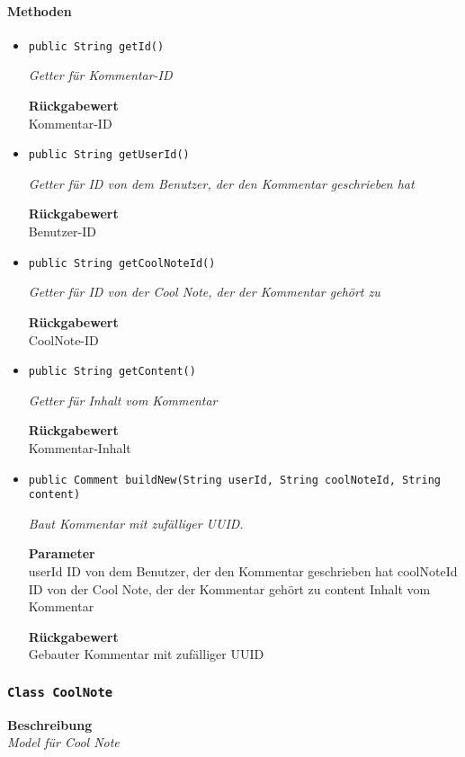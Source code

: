     \paragraph*{Methoden}
    \begin{itemize}
    	\item{\texttt{public String getId()}}
    	
    	\textit{Getter für Kommentar-ID}
    	
    	
    	
    	\textbf{Rückgabewert} \\
    	Kommentar-ID        \item{\texttt{public String getUserId()}}
    	
    	\textit{Getter für ID von dem Benutzer, der den Kommentar geschrieben hat}
    	
    	
    	
    	\textbf{Rückgabewert} \\
    	Benutzer-ID        \item{\texttt{public String getCoolNoteId()}}
    	
    	\textit{Getter für ID von der Cool Note, der der Kommentar gehört zu}
    	
    	
    	
    	\textbf{Rückgabewert} \\
    	CoolNote-ID        \item{\texttt{public String getContent()}}
    	
    	\textit{Getter für Inhalt vom Kommentar}
    	
    	
    	
    	\textbf{Rückgabewert} \\
    	Kommentar-Inhalt        \item{\texttt{public Comment buildNew(String userId, String coolNoteId, String content)}}
    	
    	\textit{Baut Kommentar mit zufälliger UUID.}
    	
    	\textbf{Parameter} \\
    	userId ID von dem Benutzer, der den Kommentar geschrieben hat
    	coolNoteId ID von der Cool Note, der der Kommentar gehört zu
    	content Inhalt vom Kommentar
    	
    	\textbf{Rückgabewert} \\
    	Gebauter Kommentar mit zufälliger UUID
    \end{itemize}
    \subsubsection{\texttt{Class CoolNote}}
    \textbf{Beschreibung} \\
    \textit{Model für Cool Note}
